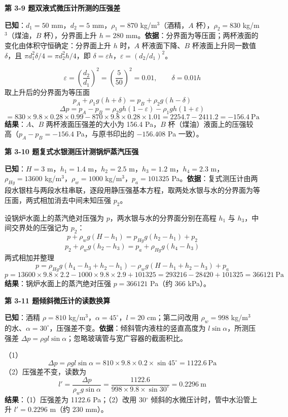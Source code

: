 \noindent\textbf{第 3-9 题\quad 双液式微压计所测的压强差}

\begin{jie}
\textbf{已知}：$d_1=50$ mm，$d_2=5$ mm，$\rho_1=870$ kg/m$^3$（酒精，$A$ 杯），$\rho_2=830$ kg/m$^3$（煤油，$B$ 杯），分界面上升 $h=280$ mm。\textbf{依据}：分界面为等压面；两杯液面的变化由体积守恒确定：分界面上升 $h$ 时，$A$ 杯液面下降、$B$ 杯液面上升同一数值 $\delta$，且 $\pi d_1^2\delta/4=\pi d_2^2h/4$，即 $\delta=\varepsilon h$，$\varepsilon=(d_2/d_1)^2$。

\[ \varepsilon=\left(\frac{d_2}{d_1}\right)^2=\left(\frac{5}{50}\right)^2=0.01,\qquad \delta=0.01h \]
取上升后的分界面为等压面
\[ p_A+\rho_1g(h+\delta)=p_B+\rho_2g(h-\delta) \]
\[ \Delta p=p_A-p_B=\rho_2gh(1-\varepsilon)-\rho_1gh(1+\varepsilon) \]
\[ =830\times9.8\times0.28\times0.99-870\times9.8\times0.28\times1.01=2254.7-2411.2=-156.4\ \mathrm{Pa} \]
\textbf{结果}：$A$、$B$ 两杯液面压强差的大小为 156.4 Pa，$B$ 杯（煤油）液面上的压强较高（$p_A-p_B=-156.4$ Pa，与原书印出的 $-156.408$ Pa 一致）。
\end{jie}

\noindent\textbf{第 3-10 题\quad 复式水银测压计测锅炉蒸汽压强}

\begin{jie}
\textbf{已知}：$H=3$ m，$h_1=1.4$ m，$h_2=2.5$ m，$h_3=1.2$ m，$h_4=2.3$ m，$\rho_{Hg}=13600$ kg/m$^3$，$\rho_w=1000$ kg/m$^3$，$p_a=101325$ Pa。\textbf{依据}：复式测压计由两段水银柱与两段水柱串联，逐段用静压强基本方程，取两处水银与水的分界面为等压面，两式相加消去中间未知压强 $p_2$。

设锅炉水面上的蒸汽绝对压强为 $p$，两水银与水的分界面分别在高程 $h_1$ 与 $h_3$，中间交界处的压强记为 $p_2$：
\[ p+\rho_w g(H-h_1)=p_{Hg}g(h_2-h_1)+p_2 \]
\[ p_2+\rho_w g(h_2-h_3)=p_a+\rho_{Hg}g(h_4-h_3) \]
两式相加并整理
\[ p=\rho_{Hg}g(h_4-h_3+h_2-h_1)-\rho_w g(H-h_1+h_2-h_3)+p_a \]
\[ p=13600\times9.8\times2.2-1000\times9.8\times2.9+101325=293216-28420+101325=366121\ \mathrm{Pa} \]
\textbf{结果}：锅炉水面上的蒸汽绝对压强 $p=366121$ Pa（约 366 kPa）。
\end{jie}

\noindent\textbf{第 3-11 题\quad 倾斜微压计的读数换算}

\begin{jie}
\textbf{已知}：酒精 $\rho=810$ kg/m$^3$，$\alpha=45^\circ$，$l=20$ cm；第二问改用 $\rho_w=998$ kg/m$^3$ 的水、$\alpha=30^\circ$，压强差不变。\textbf{依据}：倾斜管内液柱的竖直高度为 $l\sin\alpha$，所测压强差 $\Delta p=\rho gl\sin\alpha$；忽略玻璃管与宽广容器的截面积比。

（1）
\[ \Delta p=\rho gl\sin\alpha=810\times9.8\times0.2\times\sin45^\circ=1122.6\ \mathrm{Pa} \]
（2）压强差不变，读数为
\[ l'=\frac{\Delta p}{\rho_w g\sin\alpha}=\frac{1122.6}{998\times9.8\times\sin30^\circ}=0.2296\ \mathrm{m} \]
\textbf{结果}：（1）压强差为 1122.6 Pa；（2）改用 30$^\circ$ 倾斜的水微压计时，管中水沿管上升 $l'=0.2296$ m（约 230 mm）。
\end{jie}

